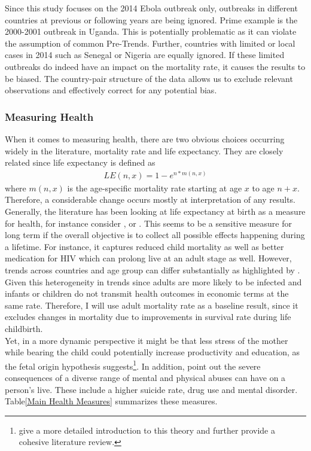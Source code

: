 \documentclass{article}
\begin{document}
Since this study focuses on the 2014 Ebola outbreak only, outbreaks in different countries at previous or following years are being ignored. Prime example is the 2000-2001 outbreak in Uganda. This is potentially problematic as it can violate the assumption of common Pre-Trends. Further, countries with limited or local cases in 2014 such as Senegal or Nigeria are equally ignored. If these limited outbreaks do indeed have an impact on the mortality rate, it causes the results to be biased. The country-pair structure of the data allows us to exclude relevant observations and effectively correct for any potential bias.

\subsubsection{Measuring Health}

When it comes to measuring health, there are two obvious choices occurring widely in the literature, mortality rate and life expectancy. They are closely related since life expectancy is defined as
\begin{align} 
LE(n,x) = 1 - e^{n*m(n,x)}
\end{align}
where $m(n,x)$ is the age-specific mortality rate starting at age $x$ to age $n + x$. Therefore, a considerable change occurs mostly at interpretation of any results. \\
Generally, the literature has been looking at life expectancy at birth as a measure for health, for instance consider \cite{bloom2018health}, \cite{acemoglu2007disease} or \cite{bloom2014disease}. This seems to be a sensitive measure for long term if the overall objective is to collect all possible effects happening during a lifetime. For instance, it captures reduced child mortality as well as better medication for HIV which can prolong live at an adult stage as well. However, trends across countries and age group can differ substantially as highlighted by \cite{mcmichael2004mortality}. Given this heterogeneity in trends since adults are more likely to be infected and infants or children do not transmit health outcomes in economic terms at the same rate. Therefore, I will use adult mortality rate as a baseline result, since it excludes changes in mortality due to improvements in survival rate during life childbirth. \\
Yet, in a more dynamic perspective it might be that less stress of the mother while bearing the child could potentially increase productivity and education, as the fetal origin hypothesis suggests\footnote{ \cite{almond2011killing} give a more detailed introduction to this theory and further provide a cohesive literature review.}. In addition, \cite{norman2012long} point out the severe consequences of a diverse range of mental and physical abuses can have on a person's live. These include a higher suicide rate, drug use and mental disorder. \\
Table\ref{Main Health Measures} summarizes these measures.
\end{document}
